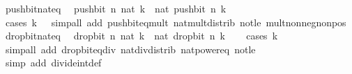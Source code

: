 \begin{isabellebody}
\isanewline
%
\endisadelimproof
\isanewline
{}\isamarkupfalse%
\ push{\isacharunderscore}{\kern0pt}bit{\isacharunderscore}{\kern0pt}nat{\isacharunderscore}{\kern0pt}eq{\isacharcolon}{\kern0pt}\isanewline
\ \ {\isacartoucheopen}push{\isacharunderscore}{\kern0pt}bit\ n\ {\isacharparenleft}{\kern0pt}nat\ k{\isacharparenright}{\kern0pt}\ {\isacharequal}{\kern0pt}\ nat\ {\isacharparenleft}{\kern0pt}push{\isacharunderscore}{\kern0pt}bit\ n\ k{\isacharparenright}{\kern0pt}{\isacartoucheclose}\isanewline
%
\isadelimproof
\ \ %
\endisadelimproof
%
\isatagproof
{}\isamarkupfalse%
\ {\isacharparenleft}{\kern0pt}cases\ {\isacartoucheopen}k\ {\isasymge}\ {}{\isacartoucheclose}{\isacharparenright}{\kern0pt}\ {\isacharparenleft}{\kern0pt}simp{\isacharunderscore}{\kern0pt}all\ add{\isacharcolon}{\kern0pt}\ push{\isacharunderscore}{\kern0pt}bit{\isacharunderscore}{\kern0pt}eq{\isacharunderscore}{\kern0pt}mult\ nat{\isacharunderscore}{\kern0pt}mult{\isacharunderscore}{\kern0pt}distrib\ not{\isacharunderscore}{\kern0pt}le\ mult{\isacharunderscore}{\kern0pt}nonneg{\isacharunderscore}{\kern0pt}nonpos{}{\isacharparenright}{\kern0pt}%
\endisatagproof
{\isafoldproof}%
%
\isadelimproof
\isanewline
%
\endisadelimproof
\isanewline
{}\isamarkupfalse%
\ drop{\isacharunderscore}{\kern0pt}bit{\isacharunderscore}{\kern0pt}nat{\isacharunderscore}{\kern0pt}eq{\isacharcolon}{\kern0pt}\isanewline
\ \ {\isacartoucheopen}drop{\isacharunderscore}{\kern0pt}bit\ n\ {\isacharparenleft}{\kern0pt}nat\ k{\isacharparenright}{\kern0pt}\ {\isacharequal}{\kern0pt}\ nat\ {\isacharparenleft}{\kern0pt}drop{\isacharunderscore}{\kern0pt}bit\ n\ k{\isacharparenright}{\kern0pt}{\isacartoucheclose}\isanewline
%
\isadelimproof
\ \ %
\endisadelimproof
%
\isatagproof
{}\isamarkupfalse%
\ {\isacharparenleft}{\kern0pt}cases\ {\isacartoucheopen}k\ {\isasymge}\ {}{\isacartoucheclose}{\isacharparenright}{\kern0pt}\isanewline
\ \ \ \isamarkupfalse%
\ {\isacharparenleft}{\kern0pt}simp{\isacharunderscore}{\kern0pt}all\ add{\isacharcolon}{\kern0pt}\ drop{\isacharunderscore}{\kern0pt}bit{\isacharunderscore}{\kern0pt}eq{\isacharunderscore}{\kern0pt}div\ nat{\isacharunderscore}{\kern0pt}div{\isacharunderscore}{\kern0pt}distrib\ nat{\isacharunderscore}{\kern0pt}power{\isacharunderscore}{\kern0pt}eq\ not{\isacharunderscore}{\kern0pt}le{\isacharparenright}{\kern0pt}\isanewline
\ \ \isamarkupfalse%
\ {\isacharparenleft}{\kern0pt}simp\ add{\isacharcolon}{\kern0pt}\ divide{\isacharunderscore}{\kern0pt}int{\isacharunderscore}{\kern0pt}def{\isacharparenright}{\kern0pt}\isanewline

\end{isabellebody}
